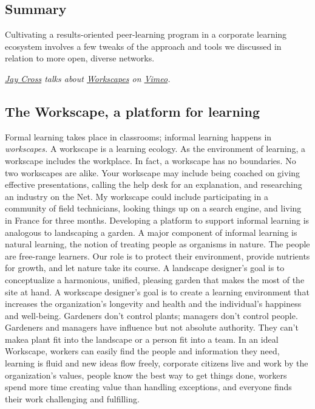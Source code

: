 \subsection{Summary}

Cultivating a results-oriented peer-learning program in a corporate
learning ecosystem involves a few tweaks of the approach and tools we
discussed in relation to more open, diverse networks.

\emph{\href{http://vimeo.com/user7021511}{Jay Cross} talks about
\emph{\href{http://vimeo.com/45989904}{Workscapes}} on
\href{http://vimeo.com}{Vimeo}.}

\subsection{The Workscape, a platform for learning}

Formal learning takes place in classrooms; informal learning happens in
\emph{workscapes.} A workscape is a learning ecology. As the environment
of learning, a workscape includes the workplace. In fact, a workscape
has no boundaries. No two workscapes are alike. Your workscape may
include being coached on giving effective presentations, calling the
help desk for an explanation, and researching an industry on the Net. My
workscape could include participating in a community of field
technicians, looking things up on a search engine, and living in France
for three months. Developing a platform to support informal learning is
analogous to landscaping a garden. A major component of informal
learning is natural learning, the notion of treating people as organisms
in nature. The people are free-range learners. Our role is to protect
their environment, provide nutrients for growth, and let nature take its
course. A landscape designer's goal is to conceptualize a harmonious,
unified, pleasing garden that makes the most of the site at hand. A
workscape designer's goal is to create a learning environment that
increases the organization's longevity and health and the individual's
happiness and well-being. Gardeners don't control plants; managers don't
control people. Gardeners and managers have influence but not absolute
authority. They can't make\emph{}a plant fit into the landscape or a
person fit into a team. In an ideal Workscape, workers can easily find
the people and information they need, learning is fluid and new ideas
flow freely, corporate citizens live and work by the organization's
values, people know the best way to get things done, workers spend more
time creating value than handling exceptions, and everyone finds their
work challenging and fulfilling.

